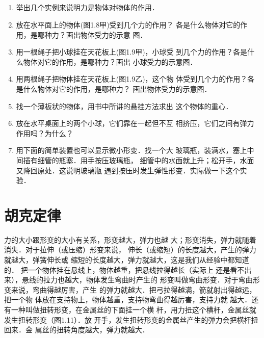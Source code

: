 \subsection*{}



\begin{enumerate}
\item  举出几个实例来说明力是物体对物体的作用．
\item 放在水平面上的物体(图1.8甲)受到几个力的作用？
  各是什么物体对它的作用，是哪种力？画出物体受力的示意
  图．
\item 用一根绳子把小球挂在天花板上(图1.9甲)，小球受
  到几个力的作用？各是什么物体对它的作用，是哪种力？画出
  小球受力的示意图．
\item 用两根绳子把物体挂在天花板上(图1.9乙)，这个物
  体受到几个力的作用？各是什么物体对它的作用，是哪种力？
  画出物体受力的示意图．
 \item 找一个薄板状的物体，用书中所讲的悬挂方法求出
  这个物体的重心．
 \item 放在水平桌面上的两个小球，它们靠在一起但不互
相挤压，它们之间有弹力作用吗？为什么？
\item 用下面的简单装置也可以显示微小形变．找一个大
玻璃瓶，装满水，塞上中间插有细管的瓶塞．用手按压玻璃瓶，
细管中的水面就上升；松开手，水面又降回原处．这说明玻璃瓶
遇到按压时发生弹性形变．实际做一下这个实验．
\end{enumerate}


\begin{Definition}[定义名称定义名称定义名称定义名称定义名称]
	\lipsum[1]
\end{Definition}



\section{胡克定律}
力的大小跟形变的大小有关系，形变越大，弹力也越
大；形变消失，弹力就随着消失．对于拉伸（或压缩）形变来说，
伸长（或缩短）的长度越大，产生的弹力就越大，弹簧伸长或
缩短的长度越大，弹力就越大，这是我们从经验中都知道的．
把一个物体挂在悬线上，物体越重，把悬线拉得越长（实际上
还是看不出来），悬线的拉力也越大，物体发生弯曲时产生的
形变叫做弯曲形变．对于弯曲形变来说，弯曲得越厉害，产生
的弹力就越大．把弓拉得越满，箭就射出得越远，把一个物
体放在支持物上，物体越重，支持物弯曲得越厉害，支持力就
越大．还有一种叫做扭转形变，在金属丝的下面挂一个横
杆，用力扭这个横杆，金属丝就发生扭转形变（图1.11）．放
开手，发生扭转形变的金属丝产生的弹力会把横杆扭回来．金
属丝的扭转角度越大，弹力就越大．

